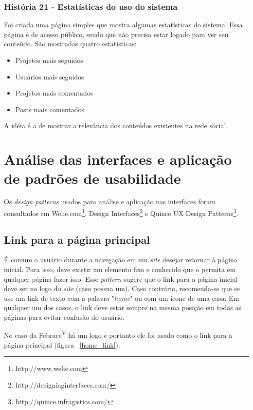     \subsubsection{História 21 - Estatísticas do uso do sistema}

        Foi criada uma página simples que mostra algumas estatísticas do sistema. Essa página é de acesso público, sendo que não precisa estar logado para ver seu conteúdo. São mostradas quatro estatísticas:
	\begin{itemize}
	  \item{
		Projetos mais seguidos
	  }
	  \item{
		Usuários mais seguidos
	  }
	  \item{ 
	    Projetos mais comentados 
	  }
	  \item{ 
	    Posts mais comentados
	  }
	\end{itemize}

        A idéia é a de mostrar a relevância dos conteúdos existentes na rede social.

\section{Análise das interfaces e aplicação de padrões de usabilidade}

Os \textit{design patterns} usados para análise e aplicação nas interfaces foram consultados em Welie.com\footnote{http://www.welie.com}, Design Interfaces\footnote{http://designinginterfaces.com/} e Quince UX Design Patterns\footnote{http://quince.infragistics.com/}.

\subsection{Link para a página principal}

É comum o usuário durante a navegação em um \textit{site} desejar retornar à página inicial. Para isso, deve existir um elemento fixo e conhecido que o permita em qualquer página fazer isso. Esse \textit{pattern} sugere que o link para a página inicial deve ser no logo do \textit{site} (caso possua um). Caso contrário, recomenda-se que se use um link de texto com a palavra "\textit{home}" ou com um ícone de uma casa. Em qualquer um dos casos, o link deve estar sempre na mesma posição em todas as páginas para evitar confusão do usuário.

No caso da Febrace\textsuperscript{V} há um logo e portanto ele foi usado como o link para a página principal (figura ~\ref{home_link}).


